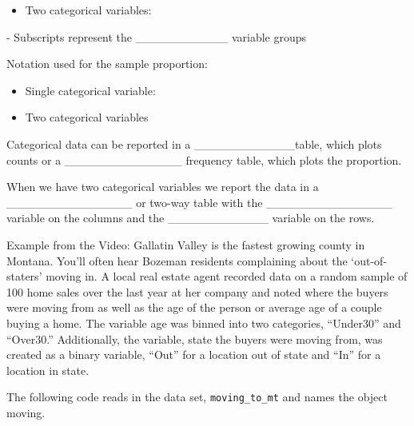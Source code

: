 \documentclass[
]{report}
\providecommand{\tightlist}{%
  \setlength{\itemsep}{0pt}\setlength{\parskip}{0pt}}
\newcommand{\rgi}{\hspace{24pt}}  %
\begin{document}
\begin{itemize}
\tightlist
\item
  Two categorical variables:
\end{itemize}

\vspace{0.2in}

\rgi \rgi - Subscripts represent the \_\_\_\_\_\_\_\_\_\_\_ variable groups

Notation used for the sample proportion:

\begin{itemize}
\tightlist
\item
  Single categorical variable:
\end{itemize}

\vspace{0.2in}

\begin{itemize}
\tightlist
\item
  Two categorical variables
\end{itemize}

\vspace{0.2in}


Categorical data can be reported in a \_\_\_\_\_\_\_\_\_\_\_\_table,
which plots counts or a \_\_\_\_\_\_\_\_\_\_\_\_\_\_
frequency table, which plots the proportion.

When we have two categorical variables we report the data in a \_\_\_\_\_\_\_\_\_\_\_\_\_\_\_ or two-way table with the \_\_\_\_\_\_\_\_\_\_\_\_\_\_\_ variable on the columns and the \_\_\_\_\_\_\_\_\_\_\_\_ variable on the rows.


\vspace{2mm}

Example from the Video: Gallatin Valley is the fastest growing county in Montana. You'll often hear Bozeman residents complaining about the `out-of-staters' moving in. A local real estate agent recorded data on a random sample of 100 home sales over the last year at her company and noted where the buyers were moving from as well as the age of the person or average age of a couple buying a home. The variable age was binned into two categories, ``Under30'' and ``Over30.'' Additionally, the variable, state the buyers were moving from, was created as a binary variable, ``Out'' for a location out of state and ``In'' for a location in state.

The following code reads in the data set, \texttt{moving\_to\_mt} and names the object moving.
\end{document}
